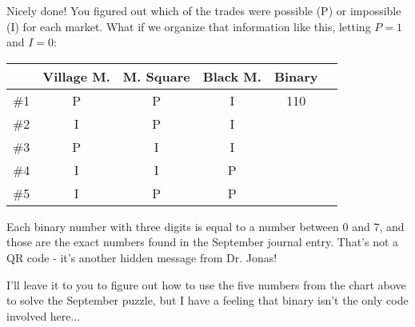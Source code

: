 Nicely done!
You figured out which of the trades were possible (P)
or impossible (I) for each market. 
What if we organize that information like this, letting
\(P=1\) and \(I=0\):

\begin{center}
\begin{tabular}{c|ccc|cc}
& Village M. & M. Square & Black M. & Binary \\\hline
\#1 & P & P & I & 110 & \\
\#2 & I & P & I \\ %
\#3 & P & I & I \\ %
\#4 & I & I & P \\ %
\#5 & I & P & P %
\end{tabular}
\end{center}

Each binary number with
three digits is equal to a number between \(0\) and \(7\),
and those are the exact numbers found in the September journal
entry. That's not a QR code - it's another hidden message from
Dr. Jonas!

I'll leave it to you to figure out how to use the five numbers
from the chart above to solve the September puzzle, but I have
a feeling that binary isn't the only code involved here...
